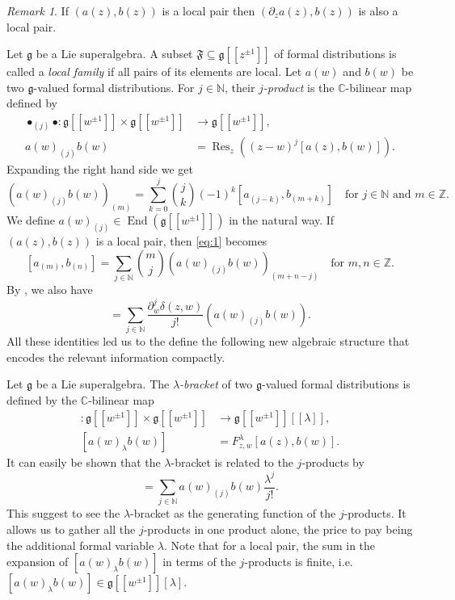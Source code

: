 \documentclass[a4paper, 12pt, reqno]{amsart}
\theoremstyle{remark}
\newtheorem{remark}[theorem]{Remark}
\numberwithin{equation}{subsection}
\DeclareMathOperator{\End}{End}
\DeclareMathOperator{\Res}{Res}
\begin{document}
\begin{remark}
  \label{rmk:4}
  If $(a(z), b(z))$ is a local pair then $(\partial_za(z), b(z))$ is also a local pair.
\end{remark}

Let $\mathfrak{g}$ be a Lie superalgebra.
A subset $\mathfrak{F} \subseteq \mathfrak{g}[[z^{\pm 1}]]$ of formal distributions is called a \emph{local family} if all pairs of its elements are local.
Let $a(w)$ and $b(w)$ be two $\mathfrak{g}$-valued formal distributions.
For $j \in \mathbb{N}$, their \emph{$j$-product} is the $\mathbb{C}$-bilinear map defined by
\begin{align}
  \nonumber
  \bullet_{(j)}\bullet: \mathfrak{g}[[w^{\pm 1}]] \times \mathfrak{g}[[w^{\pm 1}]] &\to \mathfrak{g}[[w^{\pm 1}]], \\
  \label{eq:2}
  a(w)_{(j)}b(w) &= \Res_z((z - w)^j[a(z), b(w)]).
\end{align}
Expanding the right hand side we get
\begin{equation}
  \label{eq:3}
  (a(w)_{(j)}b(w))_{(m)} = \sum_{k = 0}^j\binom{j}{k}(-1)^k[a_{(j - k)},b_{(m + k)}] \quad \text{for }j \in \mathbb{N}\text{ and }m \in \mathbb{Z}.
\end{equation}
We define $a(w)_{(j)} \in \End(\mathfrak{g}[[w^{\pm 1}]])$ in the natural way.
If $(a(z), b(z))$ is a local pair, then \eqref{eq:1} becomes
\begin{equation}
  \label{eq:4}
  [a_{(m)}, b_{(n)}] = \sum_{j \in \mathbb{N}}\binom{m}{j}(a(w)_{(j)}b(w))_{(m + n - j)} \quad \text{for }m, n \in \mathbb{Z}.
\end{equation}
By , we also have
\begin{equation*}
  [a(z), b(w)] = \sum_{j \in \mathbb{N}}\frac{\partial_w^j\delta(z, w)}{j!}(a(w)_{(j)}b(w)).
\end{equation*}
All these identities led us to the define the following new algebraic structure that encodes the relevant information compactly.

Let $\mathfrak{g}$ be a Lie superalgebra.
The \emph{$\lambda$-bracket} of two $\mathfrak{g}$-valued formal distributions is defined by the $\mathbb{C}$-bilinear map
\begin{align*}
  [\bullet_{\lambda}\bullet]: \mathfrak{g}[[w^{\pm 1}]] \times \mathfrak{g}[[w^{\pm 1}]] &\to \mathfrak{g}[[w^{\pm 1}]][[\lambda]], \\
  [a(w)_{\lambda}b(w)] &= F^{\lambda}_{z, w}[a(z), b(w)].
\end{align*}
It can easily be shown that the $\lambda$-bracket is related to the $j$-products by
\begin{equation*}
  [a(w)_{\lambda}b(w)] = \sum_{j \in \mathbb{N}}a(w)_{(j)}b(w)\frac{\lambda^j}{j!}.
\end{equation*}
This suggest to see the $\lambda$-bracket as the generating function of the $j$-products.
It allows us to gather all the $j$-products in one product alone, the price to pay being the additional formal variable $\lambda$.
Note that for a local pair, the sum in the expansion of $[a(w)_{\lambda} b(w)]$ in terms of the $j$-products is finite, i.e.\ $[a(w)_{\lambda}b(w)] \in \mathfrak{g}[[w^{\pm 1}]][\lambda]$.
\end{document}

